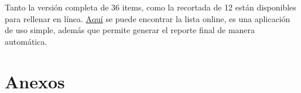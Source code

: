 \documentclass[
  spanish,
  a4paper,
  oneside]{scrbook}
\begin{document}
Tanto la versión completa de 36 items, como la recortada de 12 están
disponibles para rellenar en línea.
\href{http://www.shinyapps.org/apps/TransparencyChecklist/}{Aquí} se
puede encontrar la lista online, es una aplicación de uso simple, además
que permite generar el reporte final de manera automática.

\section*{Anexos}\label{anexos}


\begin{table}

\caption{\label{tbl-tabqrp}Algunas situaciones de QRP}

\centering{

\begingroup\fontsize{10}{12}\selectfont

}
\end{table}
\end{document}
